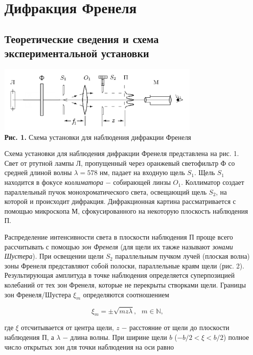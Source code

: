 \documentclass[a4paper,12pt]{article} %
\begin{document}
\section{Дифракция Френеля}
\subsection{Теоретические сведения и схема экспериментальной установки}

\begin{center}
\includegraphics[width=0.75\textwidth]{4.3.1_1.png}\\
\textbf{Рис. 1.} Схема установки для наблюдения дифракции Френеля \\
\end{center}

\hfill \break Схема установки для наблюдения дифракции Френеля представлена на рис. 1. Свет от ртутной лампы Л, пропущенный через оранжевый светофильтр Ф со средней длиной волны $\lambda = 578$ нм, падает на входную щель $S_1$. Щель $S_1$ находится в фокусе \textit{коллиматора} $-$ собирающей линзы $O_1$. Коллиматор создает параллельный пучок монохроматического света, освещающий щель $S_2$, на которой и происходит дифракция. Дифракционная картина рассматривается с помощью микроскопа М, сфокусированного на некоторую плоскость наблюдения П.

\hfill \break Распределение интенсивности света в плоскости наблюдения П проще всего рассчитывать с помощью \textit{зон Френеля} (для щели их также называют \textit{зонами Шустера}). При освещении щели $S_2$ параллельным пучком лучей (плоская волна) зоны Френеля представляют собой полоски, параллельные краям щели (рис. 2). Результирующая амплитуда в точке наблюдения определяется суперпозицией колебаний от тех зон Френеля, которые не перекрыты створками щели. Границы зон Френеля/Шустера $\xi_m$ определяются соотношением

\begin{equation}\label{ linkname }
\xi_m = \pm \sqrt{mz\lambda}, \text{ } m \in \mathbb{N},
\end{equation}

\hfill \break где $\xi$ отсчитывается от центра щели, $z$ $-$ расстояние от щели до плоскости наблюдения П, а $\lambda$ $-$ длина волны. При ширине щели $b$ ($-b/2 < \xi < b/2$) полное число открытых зон для точки наблюдения на оси равно
\end{document}
